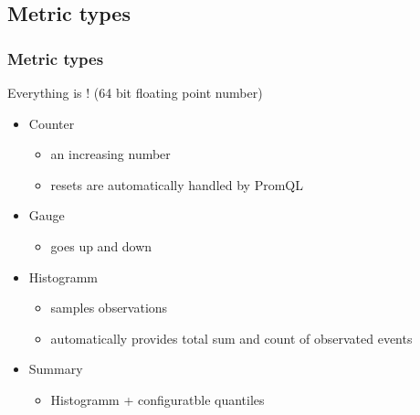 \subsection{Metric types}
\begin{frame}
  \frametitle{Metric types}

  Everything is  ! {\small(64 bit floating point number)}
  
  \begin{itemize}
   \item Counter 
    \begin{itemize}
     \item an increasing number 
     \item resets are automatically handled by PromQL
    \end{itemize}

   \item Gauge
    \begin{itemize}
     \item goes up and down
    \end{itemize}

   \item Histogramm
    \begin{itemize}
     \item samples observations
     \item automatically provides total sum and count of observated events
    \end{itemize}

   \item Summary
    \begin{itemize}
     \item Histogramm + configuratble quantiles
    \end{itemize}

  \end{itemize}
\end{frame}


